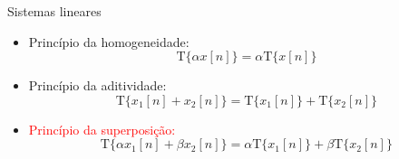 \documentclass[
size=17pt,
paper=smartboard,
mode=present,
display=slidesnotes,
style=sailor,
nopagebreaks,
blackslide,
fleqn]{powerdot}
\begin{document}
\begin{slide}{Sistemas lineares}
   \begin{itemize}
        
       \item <1->Princípio da homogeneidade:
       \begin{equation*}
        \text{T}\{\alpha x[n]\} = \alpha \text{T}\{ x[n]\}
       \end{equation*}
       \item <2->Princípio da aditividade:
       \begin{equation*}
           \text{T}\{x_1[n]+x_2[n]\} = \text{T}\{x_1[n]\} + \text{T}\{x_2[n]\}
       \end{equation*}
       \item <3>\textcolor{red}{Princípio da superposição:}
       \begin{equation*}
     \text{T}\{\alpha x_1[n] + \beta x_2[n] \}= \alpha \text{T}\{x_1[n]\} + \beta \text{T}\{x_2[n]\}
    \end{equation*}
    \end{itemize} 
\end{slide}

\end{document}

